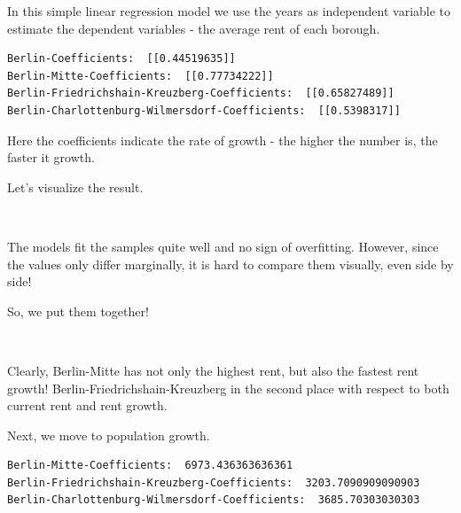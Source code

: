 \documentclass[11pt]{article}
\begin{document}
    In this simple linear regression model we use the years as independent
variable to estimate the dependent variables - the average rent of each
borough.

    

    \begin{Verbatim}[commandchars=\\\{\}]
Berlin-Coefficients:  [[0.44519635]]
Berlin-Mitte-Coefficients:  [[0.77734222]]
Berlin-Friedrichshain-Kreuzberg-Coefficients:  [[0.65827489]]
Berlin-Charlottenburg-Wilmersdorf-Coefficients:  [[0.5398317]]
    \end{Verbatim}

    Here the coefficients indicate the rate of growth - the higher the
number is, the faster it growth.

Let's visualize the result.

    
        
    \begin{center}
    \end{center}
    { \hspace*{\fill} \\}
    
    The models fit the samples quite well and no sign of overfitting.
However, since the values only differ marginally, it is hard to compare
them visually, even side by side!

So, we put them together!

    

    \begin{center}
    \end{center}
    { \hspace*{\fill} \\}
    
    Clearly, Berlin-Mitte has not only the highest rent, but also the
fastest rent growth! Berlin-Friedrichshain-Kreuzberg in the second place
with respect to both current rent and rent growth.

Next, we move to population growth.

    

    \begin{Verbatim}[commandchars=\\\{\}]
Berlin-Mitte-Coefficients:  6973.436363636361
Berlin-Friedrichshain-Kreuzberg-Coefficients:  3203.7090909090903
Berlin-Charlottenburg-Wilmersdorf-Coefficients:  3685.70303030303
    \end{Verbatim}
\end{document}
